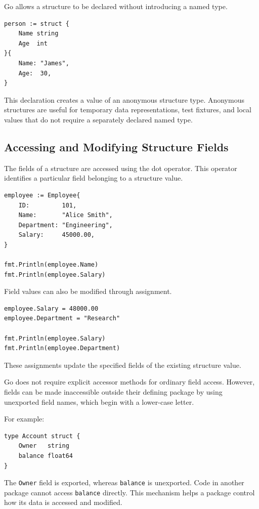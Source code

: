 Go allows a structure to be declared without introducing a named type.

\begin{lstlisting}
person := struct {
    Name string
    Age  int
}{
    Name: "James",
    Age:  30,
}
\end{lstlisting}

This declaration creates a value of an anonymous structure type. Anonymous structures are useful for temporary data representations, test fixtures, and local values that do not require a separately declared named type.

\subsection{Accessing and Modifying Structure Fields}

The fields of a structure are accessed using the dot operator. This operator identifies a particular field belonging to a structure value.

\begin{lstlisting}
employee := Employee{
    ID:         101,
    Name:       "Alice Smith",
    Department: "Engineering",
    Salary:     45000.00,
}

fmt.Println(employee.Name)
fmt.Println(employee.Salary)
\end{lstlisting}

Field values can also be modified through assignment.

\begin{lstlisting}
employee.Salary = 48000.00
employee.Department = "Research"

fmt.Println(employee.Salary)
fmt.Println(employee.Department)
\end{lstlisting}

These assignments update the specified fields of the existing structure value.

Go does not require explicit accessor methods for ordinary field access. However, fields can be made inaccessible outside their defining package by using unexported field names, which begin with a lower-case letter.

For example:

\begin{lstlisting}
type Account struct {
    Owner   string
    balance float64
}
\end{lstlisting}

The \texttt{Owner} field is exported, whereas \texttt{balance} is unexported. Code in another package cannot access \texttt{balance} directly. This mechanism helps a package control how its data is accessed and modified.

